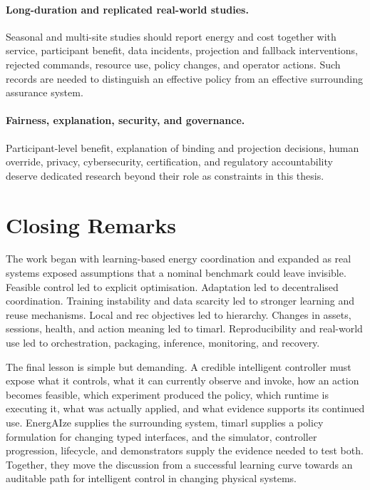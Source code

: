 \paragraph{Long-duration and replicated real-world studies.}
Seasonal and multi-site studies should report energy and cost together with service, participant benefit, data incidents, projection and fallback interventions, rejected commands, resource use, policy changes, and operator actions. Such records are needed to distinguish an effective policy from an effective surrounding assurance system.

\paragraph{Fairness, explanation, security, and governance.}
Participant-level benefit, explanation of binding and projection decisions, human override, privacy, cybersecurity, certification, and regulatory accountability deserve dedicated research beyond their role as constraints in this thesis.

\section{Closing Remarks}

The work began with learning-based energy coordination and expanded as real systems exposed assumptions that a nominal benchmark could leave invisible. Feasible control led to explicit optimisation. Adaptation led to decentralised coordination. Training instability and data scarcity led to stronger learning and reuse mechanisms. Local and \gls{rec} objectives led to hierarchy. Changes in assets, sessions, health, and action meaning led to \gls{timarl}. Reproducibility and real-world use led to orchestration, packaging, inference, monitoring, and recovery.

The final lesson is simple but demanding. A credible intelligent controller must expose what it controls, what it can currently observe and invoke, how an action becomes feasible, which experiment produced the policy, which runtime is executing it, what was actually applied, and what evidence supports its continued use. EnergAIze supplies the surrounding system, \gls{timarl} supplies a policy formulation for changing typed interfaces, and the simulator, controller progression, lifecycle, and demonstrators supply the evidence needed to test both. Together, they move the discussion from a successful learning curve towards an auditable path for intelligent control in changing physical systems.
